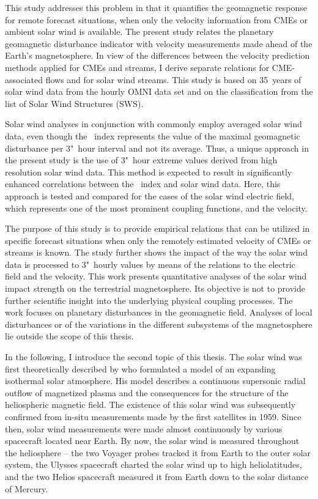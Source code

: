 This study addresses this problem in that it quantifies the geomagnetic response for remote forecast situations, when only the velocity information from CMEs or ambient solar wind is available.
The present study relates the planetary geomagnetic disturbance indicator \Kp{} with velocity measurements made ahead of the Earth's magnetosphere. In view of the differences between the velocity prediction methods applied for CMEs and streams, I derive separate relations for CME-associated flows and for solar wind streams. This study is based on 35~years of solar wind data from the hourly OMNI data set and on the classification from the list of Solar Wind Structures (SWS).

Solar wind analyses in conjunction with \Kp{} commonly employ averaged solar wind data, even though the \Kp~index represents the value of the maximal geomagnetic disturbance per 3"~hour interval and not its average. Thus, a unique approach in the present study is the use of 3"~hour extreme values derived from high resolution solar wind data. This method is expected to result in significantly enhanced correlations between the \Kp~index and solar wind data. Here, this approach is tested and compared for the cases of the solar wind electric field, which represents one of the most prominent coupling functions, and the velocity.

The purpose of this study is to provide empirical \Kp{} relations that can be utilized in specific forecast situations when only the remotely estimated velocity of CMEs or streams is known.
The study further shows the impact of the way the solar wind data is processed to 3"~hourly values by means of the \Kp{} relations to the electric field and the velocity.
This work presents quantitative analyses of the solar wind impact strength on the terrestrial magnetosphere. Its objective is not to provide further scientific insight into the underlying physical coupling processes.
The work focuses on planetary disturbances in the geomagnetic field. Analyses of local disturbances or of the variations in the different subsystems of the magnetosphere lie outside the scope of this thesis.

\bigskip

In the following, I introduce the second topic of this thesis.
The solar wind was first theoretically described by \citet{Parker1958} who formulated a model of an expanding isothermal solar atmosphere. His model describes a continuous supersonic radial outflow of magnetized plasma and the consequences for the structure of the heliospheric magnetic field. The existence of this solar wind was subsequently confirmed from in-situ measurements made by the first satellites in 1959. Since then, solar wind measurements were made almost continuously by various spacecraft located near Earth. By now, the solar wind is measured throughout the heliosphere -- the two Voyager probes tracked it from Earth to the outer solar system, the Ulysses spacecraft charted the solar wind up to high heliolatitudes, and the two Helios spacecraft measured it from Earth down to the solar distance of Mercury.

